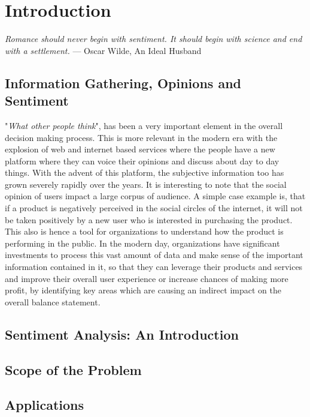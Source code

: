\chapter{Introduction}\label{chapter:introduction}
\begin{center}
\textit{Romance should never begin with sentiment. It should begin with science and end with a settlement.}
— Oscar Wilde, An Ideal Husband
\end{center}

\section{Information Gathering, Opinions and Sentiment}
"\textit{What other people think}", has been a very important element in the overall decision making process. This is more relevant in the modern era with the explosion of web and internet based services where the people have a new platform where they can voice their opinions and discuss about day to day things. With the advent of this platform, the subjective information too has grown severely rapidly over the years.  
\newline
It is interesting to note that the social opinion of users impact a large corpus of audience. A simple case example is, that if a product is negatively perceived in the social circles of the internet, it will not be taken positively by a new user who is interested in purchasing the product. This also is hence a tool for organizations to understand how the product is performing in the public. 
\newline
In the modern day, organizations have significant investments to process this vast amount of data and make sense of the important information contained in it, so that they can leverage their products and services and improve their overall user experience or increase chances of making more profit, by identifying key areas which are causing an indirect impact on the overall balance statement.    


\section{Sentiment Analysis: An Introduction}

\section{Scope of the Problem}

\section{Applications}
